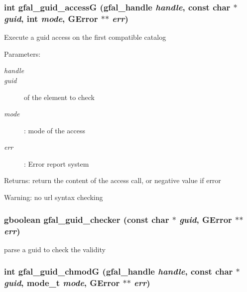 \subsubsection{\setlength{\rightskip}{0pt plus 5cm}int gfal\_\-guid\_\-access\-G (gfal\_\-handle {\em handle}, const char $\ast$ {\em guid}, int {\em mode}, GError $\ast$$\ast$ {\em err})}\label{gfal__common__guid_8c_55770e13f0626b60b830e3254df7ee9d}


Execute a guid access on the first compatible catalog \begin{Desc}
\item[Parameters:]
\begin{description}
\item[{\em handle}]\item[{\em guid}]of the element to check \item[{\em mode}]: mode of the access \item[{\em err}]: Error report system \end{description}
\end{Desc}
\begin{Desc}
\item[Returns:]return the content of the access call, or negative value if error \end{Desc}
\begin{Desc}
\item[Warning:]no url syntax checking \end{Desc}
\subsubsection{\setlength{\rightskip}{0pt plus 5cm}gboolean gfal\_\-guid\_\-checker (const char $\ast$ {\em guid}, GError $\ast$$\ast$ {\em err})}\label{gfal__common__guid_8c_9e4b6149b0256f725bc1dab5fc32ab62}


parse a guid to check the validity 
\subsubsection{\setlength{\rightskip}{0pt plus 5cm}int gfal\_\-guid\_\-chmod\-G (gfal\_\-handle {\em handle}, const char $\ast$ {\em guid}, mode\_\-t {\em mode}, GError $\ast$$\ast$ {\em err})}\label{gfal__common__guid_8c_34d01b3a64910eddc1d7988c6b1b2ae4}


